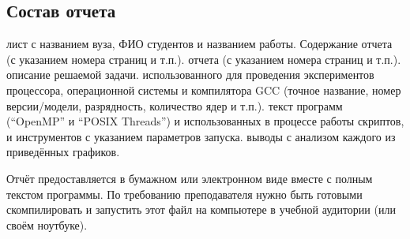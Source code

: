 \subsection{Состав отчета}

\begin{enumerate}
     лист с названием вуза, ФИО студентов и названием работы. Содержание отчета (с указанием номера страниц и т.п.).
     отчета (с указанием номера страниц и т.п.).
     описание решаемой задачи.
     использованного для проведения экспериментов процессора, операционной системы и компилятора GCC (точное название, номер версии/модели, разрядность, количество ядер и т.п.).
     текст программ (``OpenMP'' и ``POSIX Threads'') и использованных в процессе работы скриптов, и инструментов с указанием параметров запуска.
     выводы с анализом каждого из приведённых графиков.
\end{enumerate}

Отчёт предоставляется в бумажном или электронном виде вместе с полным текстом программы. По требованию преподавателя нужно быть готовыми скомпилировать и запустить этот файл на компьютере в учебной аудитории (или своём ноутбуке).
